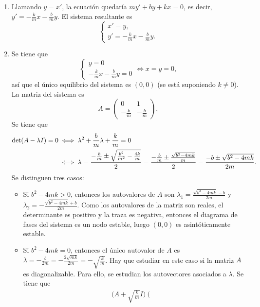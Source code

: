\documentclass[11pt]{report}
\begin{document}
\begin{solution}
    \hfill
    \begin{enumerate}
        \item Llamando $y = x'$, la ecuación quedaría $my'+by +kx = 0$, es decir, $y' = -\frac{k}{m}x -\frac{b}{m}y$. El sistema resultante es
        \[\begin{cases}
            x' = y, \\
            y' = -\frac{k}{m}x-\frac{b}{m}y.
        \end{cases}\]
        \item Se tiene que
        \[\begin{cases}
            y = 0 \\
            -\frac{k}{m}x-\frac{b}{m}y = 0
        \end{cases} \iff x=y=0,\]
        así que el único equilibrio del sistema es $(0,0)$ (se está suponiendo $k \neq 0$). La matriz del sistema es
        \[A = \left(\begin{array}{cc}
            0 & 1 \\
            -\frac{k}{m} & -\frac{b}{m}
        \end{array}\right),\]
        Se tiene que
        \begin{align*}
            \textup{det}(A-\lambda I) = 0 &\iff \lambda^2+\frac{b}{m}\lambda+\frac{k}{m} = 0 \\
            &\iff \lambda = \frac{-\frac{b}{m}\pm\sqrt{\frac{b^2}{m^2}-\frac{4k}{m}}}{2} = \frac{-\frac{b}{m}\pm\frac{\sqrt{b^2-4mk}}{m}}{2} = \frac{-b\pm\sqrt{b^2-4mk}}{2m}.
        \end{align*}
        Se distinguen tres casos:
        \begin{itemize}
            \item Si $b ^2-4mk > 0$, entonces los autovalores de $A$ son $\lambda_1 = \frac{\sqrt{b^2-4mk}-b}{2m}$ y $\lambda_2 = -\frac{\sqrt{b^2-4mk}+b}{2m}$. Como los autovalores de la matriz son reales, el determinante es positivo y la traza es negativa, entonces el diagrama de fases del sistema es un nodo estable, luego $(0,0)$ es asintóticamente estable.
            \item Si $b^2-4mk = 0$, entonces el único autovalor de $A$ es $\lambda = -\frac{b}{2m} = -\frac{2\sqrt{mk}}{2m} = -\sqrt{\frac{k}{m}}$. Hay que estudiar en este caso si la matriz $A$ es diagonalizable. Para ello, se estudian los autovectores asociados a $\lambda$. Se tiene que
            \begin{align*}
                \bigl(A+\sqrt{\frac{k}{m}}I\bigr)\left(\begin{array}{c}

\end{array}
\end{align*}
\end{itemize}
\end{enumerate}
\end{solution}
\end{document}
